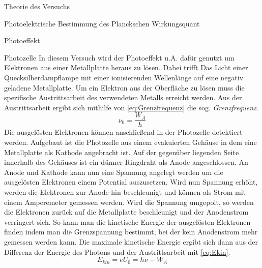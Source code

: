 \documentclass[pdftex, a4paper,11pt, twoside, ngerman]{report}
\begin{document}
\begin{chapter}{Theorie des Versuchs}
\begin{section}{Photoelektrische Bestimmung des Planckschen Wirkungsquant}
\begin{subsection}{Photoeffekt}
      \end{subsection}
     
     
     
      \begin{subsection}{Photozelle}
        \label{chp:TheoriePhotoelektrischesWirkungsquantumPhotozelle}
        In diesem Versuch wird der Photoeffekt u.A. dafür genutzt um Elektronen
        aus einer Metallplatte heraus zu lösen. Dabei trifft Das Licht einer
        Quecksilberdampflampe mit einer ionisierenden Wellenlänge auf eine
        negativ geladene Metallplatte. Um ein Elektron aus der Oberfläche zu
        lösen muss die spezifische Austrittsarbeit des verwendeten Metalls
        erreicht werden. Aus der Austrittsarbeit ergibt sich mithilfe von
        \cref{eq:Grenzfrequenz} die sog. \textit{Grenzfrequenz}.
        \begin{equation}
          \label{eq:Grenzfrequenz}
          \nu_{0}=\frac{W_{A}}{h}
        \end{equation}
        Die ausgelösten Elektronen können anschließend in der Photozelle
        detektiert werden. Aufgebaut ist die Photozelle aus einem evakuierten
        Gehäuse in dem eine Metallplatte als Kathode angebracht ist. Auf der
        gegenüber liegenden Seite innerhalb des Gehäuses ist ein dünner
        Ringdraht als Anode angeschlossen. An Anode und Kathode kann nun eine
        Spannung angelegt werden um die ausgelösten Elektronen einem Potential
        auszusetzen. Wird nun Spannung erhöht, werden die Elektronen zur Anode
        hin beschleunigt und können als Strom mit einem Amperemeter gemessen
        werden. Wird die Spannung umgepolt, so werden die Elektronen zurück
        auf die Metallplatte beschleunigt und der Anodenstrom verringert sich.
        So kann man die kinetische Energie der ausgelösten Elektronen finden
        indem man die Grenzspannung bestimmt, bei der kein Anodenstrom mehr
        gemessen werden kann. Die maximale kinetische Energie ergibt sich dann
        aus der Differenz der Energie des Photons und der Austrittsarbeit mit
        \cref{eq:Ekin}.
        \begin{equation}
          \label{eq:Ekin}
          E_{kin}=eU_{0}=h\nu-W_{A}
        \end{equation}
       

\end{subsection}
\end{section}
\end{chapter}
\end{document}
